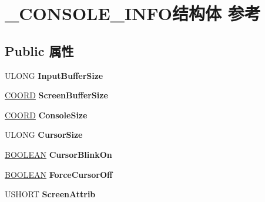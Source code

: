 \hypertarget{struct___c_o_n_s_o_l_e___i_n_f_o}{}\section{\+\_\+\+C\+O\+N\+S\+O\+L\+E\+\_\+\+I\+N\+F\+O结构体 参考}
\label{struct___c_o_n_s_o_l_e___i_n_f_o}
\subsection*{Public 属性}
\begin{DoxyCompactItemize}
\item 
\mbox{\label{struct___c_o_n_s_o_l_e___i_n_f_o_ac3c41576a1a44fea014c3a849b887f75}} 
U\+L\+O\+NG {\bfseries Input\+Buffer\+Size}
\item 
\mbox{\label{struct___c_o_n_s_o_l_e___i_n_f_o_acb175d93b0b44da29508f596bb5c9ec8}} 
\hyperlink{struct___c_o_o_r_d}{C\+O\+O\+RD} {\bfseries Screen\+Buffer\+Size}
\item 
\mbox{\label{struct___c_o_n_s_o_l_e___i_n_f_o_aee622886a0b0e95423b3f8ca76081327}} 
\hyperlink{struct___c_o_o_r_d}{C\+O\+O\+RD} {\bfseries Console\+Size}
\item 
\mbox{\label{struct___c_o_n_s_o_l_e___i_n_f_o_ad9b2979b2dc2b0cd8790c326ad9d7f7d}} 
U\+L\+O\+NG {\bfseries Cursor\+Size}
\item 
\mbox{\label{struct___c_o_n_s_o_l_e___i_n_f_o_a15100a43c6fab1859a112903881387ab}} 
\hyperlink{_processor_bind_8h_a112e3146cb38b6ee95e64d85842e380a}{B\+O\+O\+L\+E\+AN} {\bfseries Cursor\+Blink\+On}
\item 
\mbox{\label{struct___c_o_n_s_o_l_e___i_n_f_o_afe73cc4c6e346c3d54848824b0165cfe}} 
\hyperlink{_processor_bind_8h_a112e3146cb38b6ee95e64d85842e380a}{B\+O\+O\+L\+E\+AN} {\bfseries Force\+Cursor\+Off}
\item 
\mbox{\label{struct___c_o_n_s_o_l_e___i_n_f_o_a183cd6120ec57fc5f1d4d4566ed39e44}} 
U\+S\+H\+O\+RT {\bfseries Screen\+Attrib}

\end{DoxyCompactItemize}
